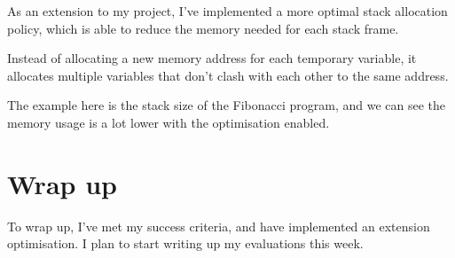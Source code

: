 \documentclass[12pt, a4paper]{article}
\begin{document}
As an extension to my project, I've implemented a more optimal stack allocation policy, which is able to reduce the memory needed for each stack frame.

Instead of allocating a new memory address for each temporary variable, it allocates multiple variables that don't clash with each other to the same address.

The example here is the stack size of the Fibonacci program, and we can see the memory usage is a lot lower with the optimisation enabled.


\section*{Wrap up}

To wrap up, I've met my success criteria, and have implemented an extension optimisation. I plan to start writing up my evaluations this week.
\end{document}
